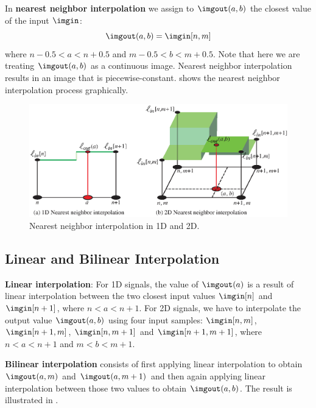 In {\bf nearest neighbor interpolation} we assign to $\imgout(a,b)$ the closest value of the input $\imgin$:
\begin{equation}
	\imgout(a,b) = \imgin [ n, m ]
\end{equation}
where $n-0.5<a<n+0.5$ and $m-0.5<b<m+0.5$. Note that here we are treating $\imgout(a,b)$ as a continuous image. Nearest neighbor interpolation results in an image that is piecewise-constant. \Fig{\ref{fig:upsampling_and_downsampling:nn_interp}} shows the nearest neighbor interpolation process graphically.
\begin{figure}[h!]
	\centerline{
		\includegraphics[width=1\linewidth]{figures/upsamplig_downsampling/nearest_interp2.eps}
	}
	\caption{Nearest neighbor interpolation in 1D and 2D.}
	\label{fig:upsampling_and_downsampling:nn_interp}
\end{figure}

\subsection{Linear and Bilinear Interpolation}
\label{sec:bilinearinterpolation}

{\bf Linear interpolation}: For 1D signals, the value of $\imgout(a)$ is a result of linear interpolation between the two closest input values $\imgin [n]$ and $\imgin [n+1]$, where $n<a<n+1$.
For 2D signals, we have to interpolate the output value $\imgout(a,b)$ using four input samples: $\imgin [ n,m ]$, $\imgin [ n+1,m ]$, $\imgin [ n,m+1 ]$ and $\imgin [ n+1,m+1 ]$, where $n<a<n+1$ and $m<b<m+1$.

	{\bf Bilinear interpolation} consists of first applying linear interpolation to obtain $\imgout(a,m)$ and $\imgout(a,m+1)$ and then again applying linear interpolation between those two values to obtain $\imgout(a,b)$. The result is illustrated in \fig{\ref{fig:bilinear_interp}}.

